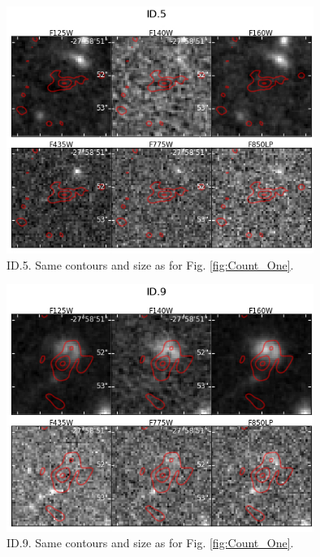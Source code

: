 \begin{figure}[!htbp]
\centering \includegraphics[width=100mm]{Matched/ASPECS_Cutout_4.jpg}
\caption{ID.5. Same contours and size as for Fig. \ref{fig:Count_One}. }
\label{fig:Count_Five}
\end{figure}

\begin{figure}[!htbp]
\centering \includegraphics[width=100mm]{Matched/ASPECS_Cutout_8.jpg}
\caption{ID.9. Same contours and size as for Fig. \ref{fig:Count_One}.}
\label{fig:Count_Nine}
\end{figure}



